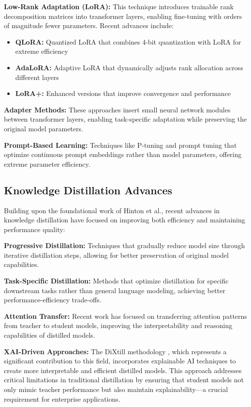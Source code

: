 \textbf{Low-Rank Adaptation (LoRA):} This technique introduces trainable rank decomposition matrices into transformer layers, enabling fine-tuning with orders of magnitude fewer parameters. Recent advances include:
\begin{itemize}
    \item \textbf{QLoRA:} Quantized LoRA that combines 4-bit quantization with LoRA for extreme efficiency
    \item \textbf{AdaLoRA:} Adaptive LoRA that dynamically adjusts rank allocation across different layers
    \item \textbf{LoRA+:} Enhanced versions that improve convergence and performance
\end{itemize}

\textbf{Adapter Methods:} These approaches insert small neural network modules between transformer layers, enabling task-specific adaptation while preserving the original model parameters.

\textbf{Prompt-Based Learning:} Techniques like P-tuning and prompt tuning that optimize continuous prompt embeddings rather than model parameters, offering extreme parameter efficiency.

\subsection{Knowledge Distillation Advances}

Building upon the foundational work of Hinton et al., recent advances in knowledge distillation have focused on improving both efficiency and maintaining performance quality:

\textbf{Progressive Distillation:} Techniques that gradually reduce model size through iterative distillation steps, allowing for better preservation of original model capabilities.

\textbf{Task-Specific Distillation:} Methods that optimize distillation for specific downstream tasks rather than general language modeling, achieving better performance-efficiency trade-offs.

\textbf{Attention Transfer:} Recent work has focused on transferring attention patterns from teacher to student models, improving the interpretability and reasoning capabilities of distilled models.

\textbf{XAI-Driven Approaches:} The DiXtill methodology \cite{XaiDrivenKnowledge}, which represents a significant contribution to this field, incorporates explainable AI techniques to create more interpretable and efficient distilled models. This approach addresses critical limitations in traditional distillation by ensuring that student models not only mimic teacher performance but also maintain explainability—a crucial requirement for enterprise applications.

